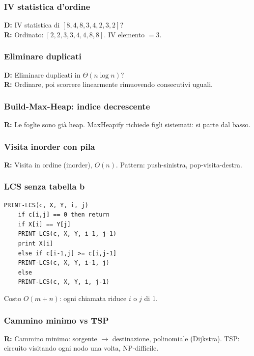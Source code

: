 \subsubsection*{\texorpdfstring{IV statistica d'ordine}{IV statistica d'ordine}}
\textbf{D:} IV statistica di $[8,4,8,3,4,2,3,2]$?\\
\textbf{R:} Ordinato: $[2,2,3,3,4,4,8,8]$. IV elemento $= 3$.

\subsubsection*{Eliminare duplicati}
\textbf{D:} Eliminare duplicati in $\Theta(n\log n)$?\\
\textbf{R:} Ordinare, poi scorrere linearmente rimuovendo consecutivi uguali.

\subsubsection*{Build-Max-Heap: indice decrescente}
\textbf{R:} Le foglie sono già heap. MaxHeapify richiede figli sistemati:
si parte dal basso.

\subsubsection*{Visita inorder con pila}
\textbf{R:} Visita in ordine (inorder), $O(n)$.
Pattern: push-sinistra, pop-visita-destra.

\subsubsection*{LCS senza tabella b}
\begin{lstlisting}[language={}, numbers=none, frame=none,
	backgroundcolor=\color{white}, basicstyle=\ttfamily\footnotesize]
	PRINT-LCS(c, X, Y, i, j)
	if c[i,j] == 0 then return
	if X[i] == Y[j]
	PRINT-LCS(c, X, Y, i-1, j-1)
	print X[i]
	else if c[i-1,j] >= c[i,j-1]
	PRINT-LCS(c, X, Y, i-1, j)
	else
	PRINT-LCS(c, X, Y, i, j-1)
\end{lstlisting}
Costo $O(m+n)$: ogni chiamata riduce $i$ o $j$ di 1.

\subsubsection*{Cammino minimo vs TSP}
\textbf{R:} Cammino minimo: sorgente $\to$ destinazione, polinomiale
(Dijkstra). TSP: circuito visitando ogni nodo una volta, NP-difficile.

